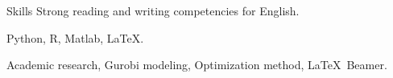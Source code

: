 
\begin{rubric}{Skills}
\entry*[Languages]
	Strong reading and writing competencies for English.

	Python, R, Matlab, \LaTeX.

\entry*[Misc.]
	Academic research, Gurobi modeling, Optimization method, \LaTeX\ Beamer.
\end{rubric}
